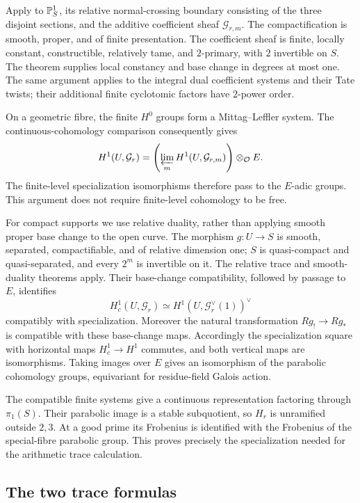 Apply \cite[Expose~XIII, Corollary~2.9]{SGA1} to
\(\mathbb P^1_S\), its relative normal-crossing boundary consisting of the
three disjoint sections, and the additive coefficient sheaf
\(\mathcal G_{r,m}\). The compactification is smooth, proper, and of
finite presentation. The coefficient sheaf is finite, locally constant,
constructible, relatively tame, and \(2\)-primary, with \(2\)
invertible on \(S\). The theorem supplies local constancy and
base change in degrees at most one. The same argument applies to the
integral dual coefficient systems and their Tate twists; their additional
finite cyclotomic factors have \(2\)-power order.

On a geometric fibre, the finite \(H^0\) groups form a
Mittag--Leffler system. The continuous-cohomology comparison
\cite[Sections~18--21]{Milne} consequently gives
\[
 H^1(U,\mathcal G_r)
   =\left(\varprojlim_m H^1(U,\mathcal G_{r,m})\right)
       \otimes_{\mathcal O}E.
\]
The finite-level specialization isomorphisms therefore pass to the
\(E\)-adic groups. This argument does not require finite-level
cohomology to be free.

For compact supports we use relative duality, rather than applying
smooth proper base change to the open curve. The morphism \(g:U\to S\)
is smooth, separated, compactifiable, and of relative dimension one;
\(S\) is quasi-compact and quasi-separated, and every \(2^m\) is
invertible on it. The relative trace and smooth-duality theorems
\cite[Expose~XVIII, Theorem~2.9, Var.~2, and Theorem~3.2.5]{SGA4}
apply. Their base-change compatibility, followed by passage to \(E\),
identifies
\[
 H_c^1(U,\mathcal G_r)
       \simeq H^1(U,\mathcal G_r^\vee(1))^\vee
\]
compatibly with specialization. Moreover the natural transformation
\(Rg_!\to Rg_*\) is compatible with these base-change maps.
Accordingly the specialization square with horizontal maps
\(H_c^1\to H^1\) commutes, and both vertical maps are isomorphisms.
Taking images over \(E\) gives an isomorphism of the parabolic
cohomology groups, equivariant for residue-field Galois action.

The compatible finite systems give a continuous representation factoring
through \(\pi_1(S)\). Their parabolic image is a stable subquotient,
so \(H_r\) is unramified outside \(2,3\). At a good prime its
Frobenius is identified with the Frobenius of the special-fibre
parabolic group. This proves precisely the specialization needed for
the arithmetic trace calculation.

\subsection{The two trace formulas}

